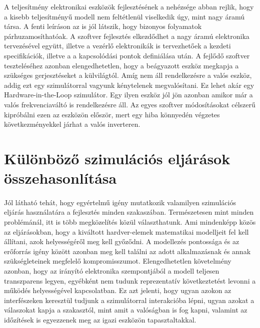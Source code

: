 A teljesítmény elektronikai eszközök fejlesztésének a nehézsége abban rejlik, hogy a kisebb teljesítményű modell nem feltétlenül viselkedik úgy, mint nagy áramú társa. A fenti leíráson az is jól látszik, hogy bizonyos folyamatok párhuzamosíthatóak. A szoftver fejlesztés elkezdődhet a nagy áramú elektronika tervezésével együtt, illetve a vezérlő elektronikák is tervezhetőek a kezdeti specifikációk, illetve a a kapcsolódási pontok definiálása után. A fejlődő szoftver teszteléséhez azonban elengedhetetlen, hogy a beágyazott eszköz megkapja a szükséges gerjesztéseket a külvilágtól. Amíg nem áll rendelkezésre a valós eszköz, addig ezt egy szimulátorral vagyunk kénytelenek megvalósítani. Ez lehet akár egy Hardware-in-the-Loop szimulátor. Egy ilyen eszköz jól jön azonban amikor már a valós frekvenciaváltó is rendelkezésre áll. Az egyes szoftver módosításokat célszerű kipróbálni ezen az eszközön először, mert egy hiba könnyedén végzetes következményekkel járhat a valós inverteren.

\section{Különböző szimulációs eljárások összehasonlítása}


\paragraph{}
Jól látható tehát, hogy egyértelmű igény mutatkozik valamilyen szimulációs eljárás használatára a fejlesztés minden szakaszában. Természetesen mint minden problémánál, itt is több megközelítés közül választhatunk. Ami mindenképp közös az eljárásokban, hogy a kiváltott hardver-elemek matematikai modelljeit fel kell állítani, azok helyességéről meg kell győződni. A modellezés pontossága és az erőforrás igény között azonban meg kell találni az adott alkalmazásnak és annak szükségleteinek megfelelő kompromisszumot. Elengedhetetlen követelmény azonban, hogy az irányító elektronika szempontjából a modell teljesen transzparens legyen, egyébként nem tudunk reprezentatív következtetést levonni a működés helyességével kapcsolatban. Ez azt jelenti, hogy ugyan azokon az interfészeken keresztül tudjunk a szimulátorral interakcióba lépni, ugyan azokat a válaszokat kapja a szakasztól, mint amit a valóságban is fog kapni, valamint az időzítések is egyezzenek meg az igazi eszközön tapasztaltakkal.

